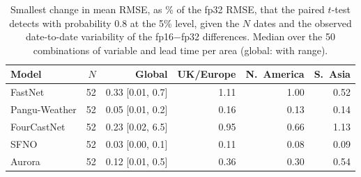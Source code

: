 \begin{table}[htbp]
\centering
\small
\caption{Smallest change in mean RMSE, as \% of the fp32 RMSE, that the paired $t$-test detects with probability 0.8 at the 5\% level, given the $N$ dates and the observed date-to-date variability of the fp16$-$fp32 differences. Median over the 50 combinations of variable and lead time per area (global: with range).}
\label{tab:power}
\begin{tabular}{lrrrrr}
\toprule
Model & $N$ & Global & UK/Europe & N.\ America & S.\ Asia \\
\midrule
FastNet & 52 & 0.33 [0.01, 0.7] & 1.11 & 1.00 & 0.52 \\
Pangu-Weather & 52 & 0.05 [0.01, 0.2] & 0.16 & 0.13 & 0.14 \\
FourCastNet & 52 & 0.23 [0.02, 6.5] & 0.95 & 0.66 & 1.13 \\
SFNO & 52 & 0.03 [0.00, 0.1] & 0.11 & 0.08 & 0.09 \\
Aurora & 52 & 0.12 [0.01, 0.5] & 0.36 & 0.30 & 0.54 \\
\bottomrule
\end{tabular}
\end{table}
